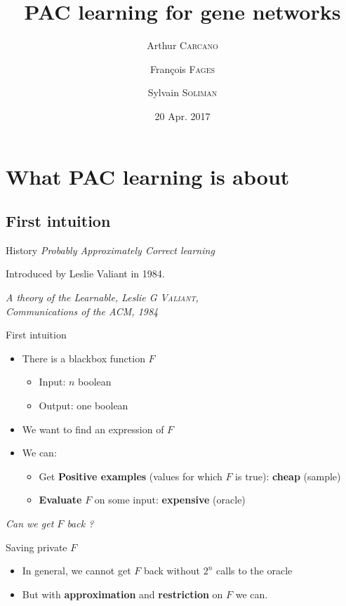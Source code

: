 \documentclass{beamer}
\title{PAC learning for gene networks}
\date{20 Apr. 2017}
\author{Arthur \textsc{Carcano}\inst{1} \and François \textsc{Fages}\inst{2} \and Sylvain \textsc{Soliman}\inst{2}}
\institute{\inst{1}\'{E}cole Normale Supérieure %
	\and \inst{2}Inria, Lifeware group}
\newcommand{\transition}{\vspace{1em}\flushright \itshape}
\begin{document}
	
	\frame{
		\titlepage
	}
	

\section{What PAC learning is about}
\subsection{First intuition}
\begin{frame}{History}
\textit{Probably Approximately Correct learning}


	Introduced by Leslie Valiant in 1984.
	
	\centering
	\textit{A theory of the Learnable, Leslie G \textsc{Valiant},\\
 	Communications of the ACM, 1984}
\end{frame}
\begin{frame}{First intuition}
\begin{itemize}
	\item There is a blackbox function $F$
	\begin{itemize}
		\item Input: $n$ boolean
		\item Output: one boolean
	\end{itemize}
	\item We want to find an expression of $F$
	\item We can:
	\begin{itemize}
		\item Get \textbf{Positive examples} (values for which $F$ is true): \textbf{cheap} (sample)
		\item \textbf{Evaluate} $F$ on some input: \textbf{expensive} (oracle)
	\end{itemize}
\end{itemize}	
\transition Can we get $F$ back ?
\end{frame}
\begin{frame}{Saving private $F$}
	\begin{itemize}
		\item In general, we cannot get $F$ back without $2^n$ calls to the oracle
		\item But with \textbf{approximation} and \textbf{restriction} on $F$ we can.	
	\end{itemize}
\end{frame}
\end{document}
